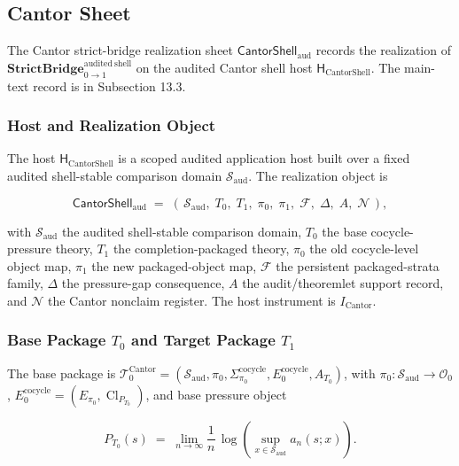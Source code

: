 \documentclass[11pt]{article}
\theoremstyle{definition}
\begin{document}
\subsection{Cantor Sheet}

The Cantor strict-bridge realization sheet \(\mathsf{CantorShell}_{\mathrm{aud}}\) records the realization of \(\mathbf{StrictBridge}_{0\to 1}^{\mathrm{audited\ shell}}\) on the audited Cantor shell host \(\mathsf H_{\mathrm{CantorShell}}\). The main-text record is in Subsection 13.3.

\subsubsection{Host and Realization Object}

The host \(\mathsf H_{\mathrm{CantorShell}}\) is a scoped audited application host built over a fixed audited shell-stable comparison domain \(\mathcal S_{\mathrm{aud}}\). The realization object is

\[
\mathsf{CantorShell}_{\mathrm{aud}}\;=\;(\,\mathcal S_{\mathrm{aud}},\;T_{0},\;T_{1},\;\pi_{0},\;\pi_{1},\;\mathcal F,\;\Delta,\;A,\;\mathcal N\,),
\]

with \(\mathcal S_{\mathrm{aud}}\) the audited shell-stable comparison domain, \(T_{0}\) the base cocycle-pressure theory, \(T_{1}\) the completion-packaged theory, \(\pi_{0}\) the old cocycle-level object map, \(\pi_{1}\) the new packaged-object map, \(\mathcal F\) the persistent packaged-strata family, \(\Delta\) the pressure-gap consequence, \(A\) the audit/theoremlet support record, and \(\mathcal N\) the Cantor nonclaim register. The host instrument is \(I_{\mathrm{Cantor}}\).

\subsubsection{\texorpdfstring{Base Package \(T_{0}\) and Target Package \(T_{1}\)}{D.2.2 Base Package T\_\{0\} and Target Package T\_\{1\}}}

The base package is \(\mathcal T_{0}^{\mathrm{Cantor}}=(\mathcal S_{\mathrm{aud}},\pi_{0},\Sigma_{\pi_{0}}^{\mathrm{cocycle}},E_{0}^{\mathrm{cocycle}},A_{T_{0}})\), with \(\pi_{0}:\mathcal S_{\mathrm{aud}}\to\mathcal O_{0}\), \(E_{0}^{\mathrm{cocycle}}=(E_{\pi_{0}},\operatorname{Cl}_{P_{T_{0}}})\), and base pressure object

\[
P_{T_{0}}(s)\;=\;\lim_{n\to\infty}\frac{1}{n}\,\log\!\left(\sup_{x\in\mathcal S_{\mathrm{aud}}}a_{n}(s;x)\right).
\]
\end{document}
